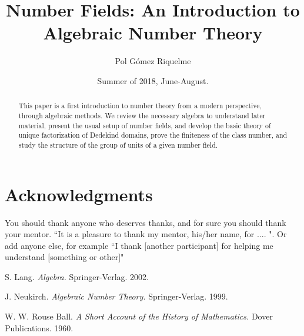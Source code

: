 \documentclass[psamsfonts]{amsart}
\title{Number Fields: An Introduction to Algebraic Number Theory}
\author{Pol Gómez Riquelme}
\date{Summer of 2018, June-August.}
\theoremstyle{definition}
\theoremstyle{remark}
\numberwithin{equation}{section}
\begin{document}
\begin{abstract}

This paper is a first introduction to number theory from a modern perspective, through algebraic methods. We review the necessary algebra to understand later material, present the usual setup of number fields, and develop the basic theory of unique factorization of Dedekind domains, prove the finiteness of the class number, and study the structure of the group of units of a given number field.

\end{abstract}

\maketitle

\tableofcontents











\section*{Acknowledgments}  You should thank anyone who deserves thanks, and for sure you should
thank your mentor.   ``It is a pleasure to thank my mentor, 
his/her name, for ....  ".   Or add anyone else, for example ``I thank [another participant] for helping 
me understand [something or other]"

\begin{thebibliography}{9}

S. Lang.
\emph{Algebra.}
Springer-Verlag. 2002.

J. Neukirch.
\emph{Algebraic Number Theory.}
Springer-Verlag. 1999.

W. W. Rouse Ball.
\emph{A Short Account of the History of Mathematics.}
Dover Publications. 1960.

\end{thebibliography}
\end{document}
